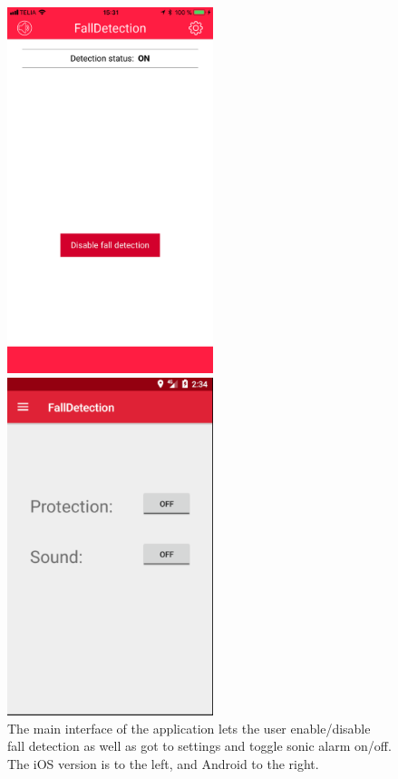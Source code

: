 \documentclass[12pt, a4paper, onecolumn]{article}
\begin{document}
	\begin{figure}[H]
		\begin{multicols}{2}
			\centering
			\includegraphics[width=6cm]{../img/screenshots/main-screen.jpg}\par 
			\includegraphics[width=6cm]{../img/screenshots/main-screen-android.png}\par 
		\end{multicols}
		\caption{The main interface of the application lets the user enable/disable fall detection as well as got to settings and toggle sonic alarm on/off. The iOS version is to the left, and Android to the right.}%
		\label{fig:main-screen}%
	\end{figure}
	
\end{document}
